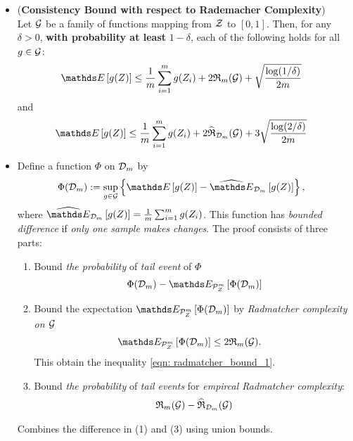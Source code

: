 \documentclass[11pt]{article}
\begin{document}
\begin{itemize}
\item \begin{proposition} (\textbf{Consistency Bound with respect to Rademacher Complexity}) \citep{mohri2018foundations}\\
Let ${\mathcal G}$ be a family of functions mapping from ${\mathcal Z}$ to $[0, 1]$. Then, for any $\delta > 0$, \textbf{with probability at least} $1 - \delta$, each of the following holds for all $g \in {\mathcal G}$:
\begin{align}
\E{}{g(Z)} &\le \frac{1}{m}\sum_{i=1}^{m}g(Z_i) + 2 \frR_{m}(\cG)  + \sqrt{\frac{\log(1 / \delta)}{2m}} \label{eqn: radmatcher_bound_1}
\end{align}
and
\begin{align}
\E{}{g(Z)} &\le \frac{1}{m}\sum_{i=1}^{m}g(Z_i) + 2 \widehat{\mathfrak{R}}_{\cD_m}(\cG) + 3\sqrt{\frac{\log(2 / \delta)}{2m}} \label{eqn: radmatcher_bound_2}
\end{align}
\end{proposition}

\item \begin{remark} 
Define a function $\Phi$ on ${\mathcal D}_m$ by
\begin{align*}
\Phi(\cD_m) &:= \sup_{g \in \cG}\set{\E{}{g(Z)} - \Em{\cD_{m}}{g(Z)}},
\end{align*} where $\Em{\cD_{m}}{g(Z)} = \frac{1}{m}\sum_{i=1}^{m}g(Z_i)$. This function has \emph{bounded difference} if \emph{only one sample makes changes}. The proof consists of three parts:
\begin{enumerate}
\item Bound \emph{the probability} of \emph{tail event} of $\Phi$
\begin{align*}
\Phi(\cD_m) - \E{\cP_{Z}^{m}}{\Phi(\cD_m)}
\end{align*}
\item Bound the expectation $\E{\cP_{Z}^{m}}{\Phi(\cD_m)}$ by \emph{Radmatcher complexity on ${\mathcal G}$}
\begin{align*}
\E{\cP_{Z}^{m}}{\Phi(\cD_m)} &\le 2   \frR_{m}(\cG).
\end{align*} This obtain the inequality \eqref{eqn: radmatcher_bound_1}.

\item Bound \emph{the probability} of \emph{tail events} for \emph{empircal Radmatcher complexity}:
\begin{align*}
{\mathfrak R}_{m}({\mathcal G})  - \widehat{\mathfrak{R}}_{{\mathcal D}_m}({\mathcal G})
\end{align*}
\end{enumerate}
Combines the difference in (1) and (3) using union bounds. 
\end{remark}


\end{itemize}
\end{document}
